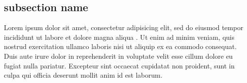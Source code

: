 \begin{bibunit}
\subsection*{subsection name}
Lorem ipsum dolor sit amet, consectetur adipisicing elit, sed do eiusmod tempor incididunt ut labore et dolore magna aliqua \cite*{gufuGrowthReproductionFunctional2019}. Ut enim ad minim veniam, quis nostrud exercitation ullamco laboris nisi ut aliquip ex ea commodo consequat. Duis aute irure dolor in reprehenderit in voluptate velit esse cillum dolore eu fugiat nulla pariatur. Excepteur sint occaecat cupidatat non proident, sunt in culpa qui officia deserunt mollit anim id est laborum.

\putbib

\end{bibunit}
